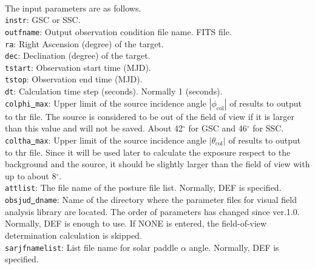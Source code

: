 \documentclass[10pt]{report}
\renewcommand{\_}{\textscale{.5}{\textbf{\textunderscore}}}
\begin{document}
\

The input parameters are as follows. \\

\noindent \texttt{instr}: GSC or SSC. \\

\noindent \texttt{outfname}: Output observation condition file name. FITS file. \\

\noindent \texttt{ra}: Right Ascension (degree) of the target. \\

\noindent \texttt{dec}: Declination (degree) of the target. \\

\noindent \texttt{tstart}: Observation start time (MJD).\\

\noindent \texttt{tstop}: Observation end time (MJD). \\

\noindent \texttt{dt}: Calculation time step (seconds). Normally 1 (seconds).\\

\noindent \texttt{colphi\underline{ }max}: Upper limit of the source incidence angle $|\phi_{\text{col}}|$ of results to output to thr file. The source is considered to be out of the field of view if it is larger than this value and will not be saved. About 42$^{\circ}$ for GSC and 46$^\circ$ for SSC.\\

\noindent \texttt{coltha\underline{ }max}: Upper limit of the source incidence angle $|\theta_{\text{col}}|$ of results to output to thr file. Since it will be used later to calculate the exposure respect to the background and the source, it should be slightly larger than the field of view with up to about 8$^\circ$.\\

\noindent \texttt{attlist}:  The file name of the posture file list. Normally, DEF is specified. \\

\noindent \texttt{obsjud\underline{ }dname}: Name of the directory where the parameter files for visual field analysis library are located. The order of parameters has changed since ver.1.0. Normally, DEF is enough to use. If NONE is entered, the field-of-view determination calculation is skipped. \\

\noindent \texttt{sarjfnamelist}: List file name for solar paddle $\alpha$ angle. Normally, DEF is specified. \\
\end{document}
